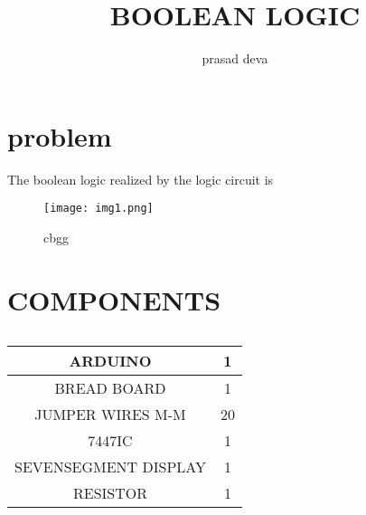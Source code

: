 \documentclass[journal,12pt,twocolumn]{IEEEtran}
\title{BOOLEAN LOGIC}
\author{prasad deva}
\begin{document}
\maketitle

\section{problem}
The boolean logic realized by the logic circuit is

\begin{figure}[h]
    \centering
    \texttt{[image: img1.png]}
    
    \caption{cbgg}

\end{figure}
\bigskip

\section{COMPONENTS}
\begin{table}[ht!]
    \centering
    \begin{tabular}{|c|c|}
    \hline
         ARDUINO& 1  \\
         \hline
         BREAD BOARD& 1 \\
         \hline
         JUMPER WIRES M-M& 20  \\
         \hline
         7447IC& 1 \\
         \hline
   SEVENSEGMENT DISPLAY& 1 \\
   \hline
RESISTOR& 1 \\
\hline
    \end{tabular}
    \caption{}
\end{table}
\end{document}
